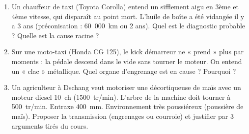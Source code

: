 \documentclass[11pt]{article}
\begin{document}
\begin{exercice}
\begin{enumerate}
    \item Un chauffeur de taxi (Toyota Corolla) entend un sifflement aigu en 3ème et 4ème vitesse, qui disparaît au point mort. L'huile de boîte a été vidangée il y a 3 ans (préconisation : 60~000~km ou 2 ans). Quel est le diagnostic probable ? Quelle est la cause racine ?
    \item Sur une moto-taxi (Honda CG 125), le kick démarreur ne « prend » plus par moments : la pédale descend dans le vide sans tourner le moteur. On entend un « clac » métallique. Quel organe d'engrenage est en cause ? Pourquoi ?
    \item Un agriculteur à Dschang veut motoriser une décortiqueuse de maïs avec un moteur diesel 10~ch (1500~tr/min). L'arbre de la machine doit tourner à 500~tr/min. Entraxe 400~mm. Environnement très poussiéreux (poussière de maïs). Proposer la transmission (engrenages ou courroie) et justifier par 3 arguments tirés du cours.
\end{enumerate}
\end{exercice}
\end{document}
